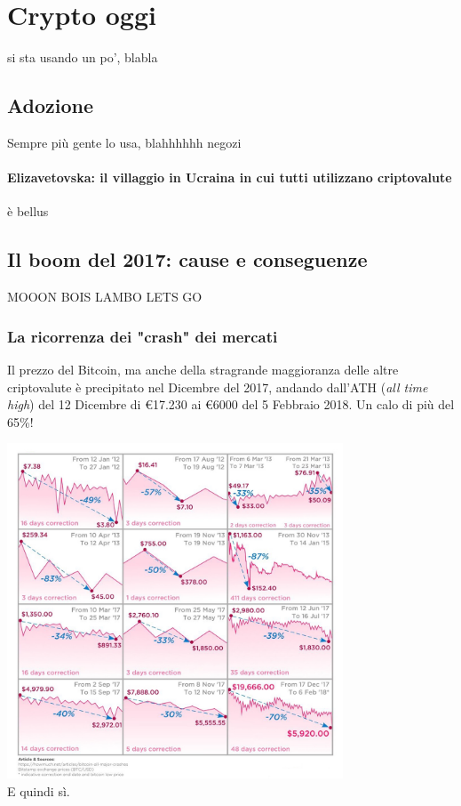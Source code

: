 \documentclass {article}
\begin{document}
{\section {Crypto oggi}


si sta usando un po', blabla


\subsection {Adozione}


Sempre più gente lo usa, blahhhhhh negozi


\paragraph {Elizavetovska: il villaggio in Ucraina in cui tutti utilizzano criptovalute}


è bellus


\subsection {Il boom del 2017: cause e conseguenze}


MOOON BOIS LAMBO LETS GO


\subsubsection {La ricorrenza dei "crash" dei mercati}


Il prezzo del Bitcoin, ma anche della stragrande maggioranza delle altre criptovalute è precipitato nel Dicembre del 2017, andando dall'ATH (\textit{all time high}) del 12 Dicembre di \euro{17.230} ai \euro{6000} del 5 Febbraio 2018. Un calo di più del 65\%!

\vspace {0.5cm}
\includegraphics [width = 10cm] {media/crash.jpg}
\vspace {0.5cm}
\\
E quindi sì.


}
\end{document}
